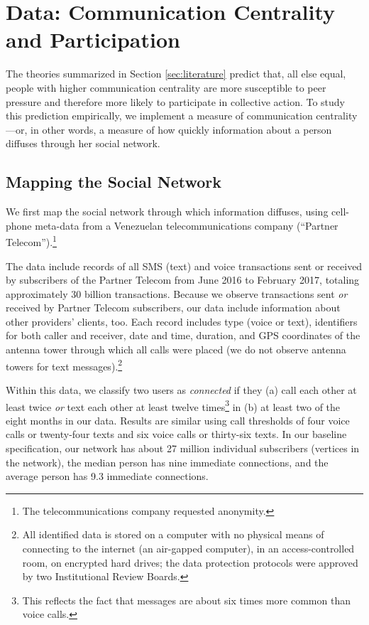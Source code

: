 \documentclass[12pt]{article}
\begin{document}
\section{Data: Communication Centrality and Participation}\label{sec:measurement}

The theories summarized in Section \ref{sec:literature} predict that, all else equal, people with higher communication centrality are more susceptible to peer pressure and therefore more likely to participate in collective action. To study this prediction empirically, we implement a measure of communication centrality---or, in other words, a measure of how quickly information about a person diffuses through her social network.

\subsection{Mapping the Social Network}

We first map the social network through which information diffuses, using cell-phone meta-data from a Venezuelan telecommunications company (``Partner Telecom'').\footnote{The telecommunications company requested anonymity.}

The data include records of all SMS (text) and voice transactions sent or received by subscribers of the Partner Telecom from June 2016 to February 2017, totaling approximately 30 billion transactions. Because we observe transactions sent \emph{or} received by Partner Telecom subscribers, our data include information about other providers' clients, too. Each record includes type (voice or text), identifiers for both caller and receiver, date and time, duration, and GPS coordinates of the antenna tower through which all calls were placed (we do not observe antenna towers for text messages).\footnote{All identified data is stored on a computer with no physical means of connecting to the internet (an air-gapped computer), in an access-controlled room, on encrypted hard drives; the data protection protocols were approved by two Institutional Review Boards.}

Within this data, we classify two users as \emph{connected} if they (a) call each other at least twice \emph{or} text each other at least twelve times\footnote{This reflects the fact that messages are about six times more common than voice calls.} in (b) at least two of the eight months in our data. Results are similar using call thresholds of four voice calls or twenty-four texts and six voice calls or thirty-six texts. In our baseline specification, our network has about 27 million individual subscribers (vertices in the network), the median person has nine immediate connections, and the average person has 9.3 immediate connections.
\end{document}
